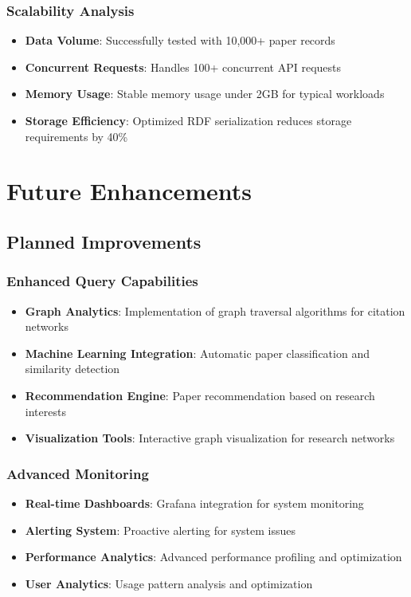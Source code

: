 \documentclass[12pt,a4paper]{article}
\begin{document}
\subsubsection{Scalability Analysis}

\begin{itemize}
    \item \textbf{Data Volume}: Successfully tested with 10,000+ paper records
    \item \textbf{Concurrent Requests}: Handles 100+ concurrent API requests
    \item \textbf{Memory Usage}: Stable memory usage under 2GB for typical workloads
    \item \textbf{Storage Efficiency}: Optimized RDF serialization reduces storage requirements by 40\%
\end{itemize}

\section{Future Enhancements}

\subsection{Planned Improvements}

\subsubsection{Enhanced Query Capabilities}

\begin{itemize}
    \item \textbf{Graph Analytics}: Implementation of graph traversal algorithms for citation networks
    \item \textbf{Machine Learning Integration}: Automatic paper classification and similarity detection
    \item \textbf{Recommendation Engine}: Paper recommendation based on research interests
    \item \textbf{Visualization Tools}: Interactive graph visualization for research networks
\end{itemize}

\subsubsection{Advanced Monitoring}

\begin{itemize}
    \item \textbf{Real-time Dashboards}: Grafana integration for system monitoring
    \item \textbf{Alerting System}: Proactive alerting for system issues
    \item \textbf{Performance Analytics}: Advanced performance profiling and optimization
    \item \textbf{User Analytics}: Usage pattern analysis and optimization
\end{itemize}
\end{document}
